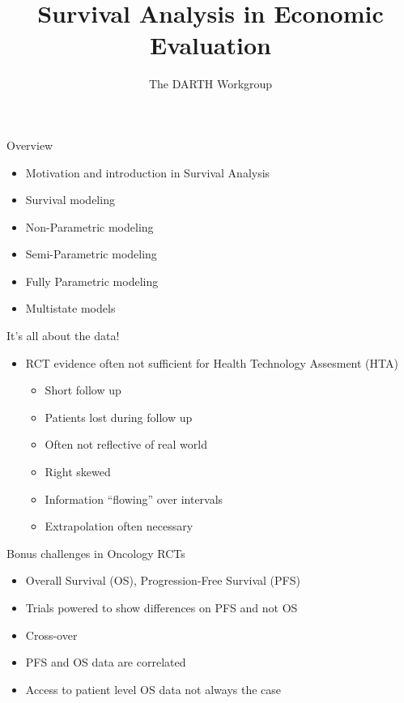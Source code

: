 \documentclass[
  ignorenonframetext,
]{beamer}
\title{Survival Analysis in Economic Evaluation}
\subtitle{The DARTH Workgroup}
\author{}
\date{\vspace{-2.5em}}
\providecommand{\tightlist}{%
  \setlength{\itemsep}{0pt}\setlength{\parskip}{0pt}}
\begin{document}
\frame{\titlepage}

\begin{frame}{Overview}
\protect\hypertarget{overview}{}

\begin{itemize}
\tightlist
\item
  Motivation and introduction in Survival Analysis
\item
  Survival modeling
\item
  Non-Parametric modeling
\item
  Semi-Parametric modeling
\item
  Fully Parametric modeling
\item
  Multistate models
\end{itemize}

\end{frame}

\begin{frame}{It's all about the data!}
\protect\hypertarget{its-all-about-the-data}{}

\begin{itemize}
\tightlist
\item
  RCT evidence often not sufficient for Health Technology Assesment
  (HTA)

  \begin{itemize}
  \tightlist
  \item
    Short follow up
  \item
    Patients lost during follow up
  \item
    Often not reflective of real world
  \item
    Right skewed\\
  \item
    Information ``flowing'' over intervals
  \item
    Extrapolation often necessary
  \end{itemize}
\end{itemize}

\end{frame}

\begin{frame}{Bonus challenges in Oncology RCTs}
\protect\hypertarget{bonus-challenges-in-oncology-rcts}{}

\begin{itemize}
\tightlist
\item
  Overall Survival (OS), Progression-Free Survival (PFS)
\item
  Trials powered to show differences on PFS and not OS
\item
  Cross-over
\item
  PFS and OS data are correlated
\item
  Access to patient level OS data not always the case
\end{itemize}

\end{frame}
\end{document}
